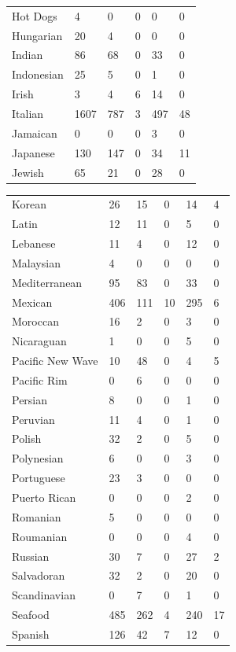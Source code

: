 \documentclass[letterpaper,10pt]{article}
\begin{document}
\begin{table}[h]
\begin{minipage}{.5\textwidth}
\begin{tabular}{llllll}
Hot Dogs & 4 & 0 & 0 & 0 & 0 \\
Hungarian & 20 & 4 & 0 & 0 & 0 \\
Indian & 86 & 68 & 0 & 33 & 0 \\
Indonesian & 25 & 5 & 0 & 1 & 0 \\
Irish & 3 & 4 & 6 & 14 & 0 \\
Italian & 1607 & 787 & 3 & 497 & 48 \\
Jamaican & 0 & 0 & 0 & 3 & 0 \\
Japanese & 130 & 147 & 0 & 34 & 11 \\
Jewish & 65 & 21 & 0 & 28 & 0 \\
\end{tabular}
\end{minipage}%
\begin{minipage}{.5\textwidth}
\begin{tabular}{llllll}
Korean & 26 & 15 & 0 & 14 & 4 \\
Latin & 12 & 11 & 0 & 5 & 0 \\
Lebanese & 11 & 4 & 0 & 12 & 0 \\
Malaysian & 4 & 0 & 0 & 0 & 0 \\
Mediterranean & 95 & 83 & 0 & 33 & 0 \\
Mexican & 406 & 111 & 10 & 295 & 6 \\
Moroccan & 16 & 2 & 0 & 3 & 0 \\
Nicaraguan & 1 & 0 & 0 & 5 & 0 \\
Pacific New Wave & 10 & 48 & 0 & 4 & 5 \\
Pacific Rim & 0 & 6 & 0 & 0 & 0 \\
Persian & 8 & 0 & 0 & 1 & 0 \\
Peruvian & 11 & 4 & 0 & 1 & 0 \\
Polish & 32 & 2 & 0 & 5 & 0 \\
Polynesian & 6 & 0 & 0 & 3 & 0 \\
Portuguese & 23 & 3 & 0 & 0 & 0 \\
Puerto Rican & 0 & 0 & 0 & 2 & 0 \\
Romanian & 5 & 0 & 0 & 0 & 0 \\
Roumanian & 0 & 0 & 0 & 4 & 0 \\
Russian & 30 & 7 & 0 & 27 & 2 \\
Salvadoran & 32 & 2 & 0 & 20 & 0 \\
Scandinavian & 0 & 7 & 0 & 1 & 0 \\
Seafood & 485 & 262 & 4 & 240 & 17 \\
Spanish & 126 & 42 & 7 & 12 & 0 \\

\end{tabular}
\end{minipage}
\end{table}
\end{document}
